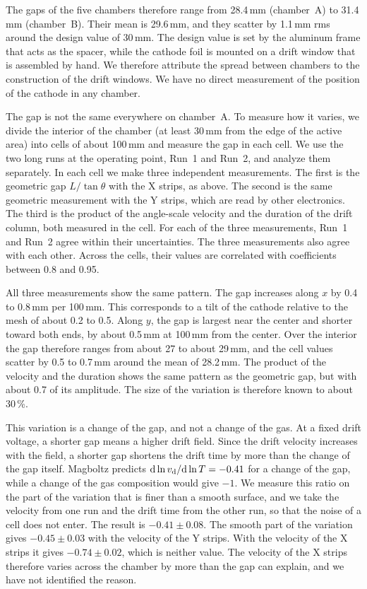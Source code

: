 The gaps of the five chambers therefore range from 28.4\,mm (chamber~A) to 31.4\,mm (chamber~B). Their mean is
29.6\,mm, and they scatter by 1.1\,mm rms around the design value of 30\,mm. The design value is set by the aluminum
frame that acts as the spacer, while the cathode foil is mounted on a drift window that is assembled by hand. We
therefore attribute the spread between chambers to the construction of the drift windows. We have no direct
measurement of the position of the cathode in any chamber.


The gap is not the same everywhere on chamber~A. To measure how it varies, we divide the interior of the chamber (at
least 30\,mm from the edge of the active area) into cells of about 100\,mm and measure the gap in each cell. We use the
two long runs at the operating point, Run~1 and Run~2, and analyze them separately. In each cell we make three
independent measurements. The first is the geometric gap $L/\tan\theta$ with the X strips, as above. The second is the
same geometric measurement with the Y strips, which are read by other electronics. The third is the product of the
angle-scale velocity and the duration of the drift column, both measured in the cell. For each of the three
measurements, Run~1 and Run~2 agree within their uncertainties. The three measurements also agree with each other.
Across the cells, their values are correlated with coefficients between 0.8 and 0.95.

All three measurements show the same pattern. The gap increases along $x$ by 0.4 to 0.8\,mm per 100\,mm. This
corresponds to a tilt of the cathode relative to the mesh of about 0.2 to 0.5\textdegree. Along $y$, the gap is
largest near the center and shorter toward both ends, by about 0.5\,mm at 100\,mm from the center. Over the interior
the gap therefore ranges from about 27 to about 29\,mm, and the cell values scatter by 0.5 to 0.7\,mm around the mean
of 28.2\,mm. The product of the velocity and the duration shows the same pattern as the geometric gap, but with about
0.7 of its amplitude. The size of the variation is therefore known to about 30\,\%.

This variation is a change of the gap, and not a change of the gas. At a fixed drift voltage, a shorter gap means a
higher drift field. Since the drift velocity increases with the field, a shorter gap shortens the drift time by more
than the change of the gap itself. Magboltz predicts $\mathrm{d}\ln v_\mathrm{d}/\mathrm{d}\ln T=-0.41$ for a change of the gap,
while a change of the gas composition would give $-1$. We measure this ratio on the part of the variation that is
finer than a smooth surface, and we take the velocity from one run and the drift time from the other run, so that the
noise of a cell does not enter. The result is $-0.41\pm0.08$. The smooth part of the variation gives $-0.45\pm0.03$
with the velocity of the Y strips. With the velocity of the X strips it gives $-0.74\pm0.02$, which is neither value.
The velocity of the X strips therefore varies across the chamber by more than the gap can explain, and we have not
identified the reason.

